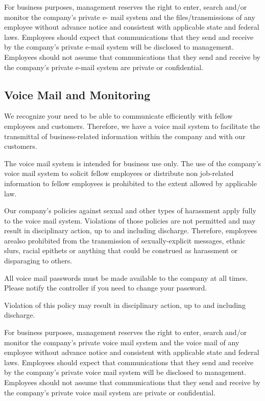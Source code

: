 For business purposes, management reserves the right to enter, search and/or monitor the company's private e- mail system and the files/transmissions of any employee without advance notice and consistent with applicable state and federal laws. Employees should expect that communications that they send and receive by the company's private e-mail system will be disclosed to management. Employees should not assume that communications that they send and receive by the company's private e-mail system are private or confidential.

\subsection{Voice Mail and Monitoring}

We recognize your need to be able to communicate efficiently with fellow employees and customers. Therefore, we have a voice mail system to facilitate the transmittal of business-related information within the company and with our customers.

The voice mail system is intended for business use only. The use of the company's voice mail system to solicit fellow employees or distribute non job-related information to fellow employees is prohibited to the extent allowed by applicable law.

Our company's policies against sexual and other types of harassment apply fully to the voice mail system. Violations of those policies are not permitted and may result in disciplinary action, up to and including discharge. Therefore, employees arealso prohibited from the transmission of sexually-explicit messages, ethnic slurs, racial epithets or anything that could be construed as harassment or disparaging to others.

All voice mail passwords must be made available to the company at all times. Please notify the controller if you need to change your password.

Violation of this policy may result in disciplinary action, up to and including discharge.

For business purposes, management reserves the right to enter, search and/or monitor the company's private voice mail system and the voice mail of any employee without advance notice and consistent with applicable state and federal laws. Employees should expect that communications that they send and receive by the company's private voice mail system will be disclosed to management. Employees should not assume that communications that they send and receive by the company's private voice mail system are private or confidential.

